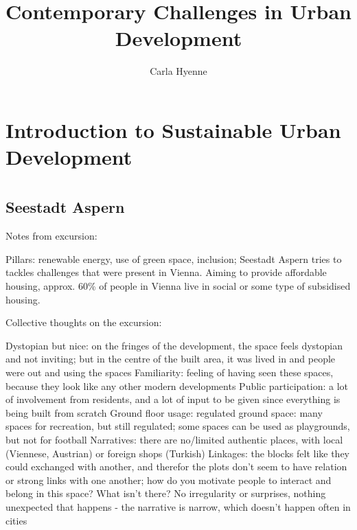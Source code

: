 \documentclass{article}
\title{Contemporary Challenges in Urban Development}
\author{Carla Hyenne}
\begin{document}
\maketitle

\tableofcontents

\pagebreak

\section{Introduction to Sustainable Urban Development}

\section{}

\subsection{Seestadt Aspern}

Notes from excursion:

\begin{outline}
	\1 Pillars: renewable energy, use of green space, inclusion;
	\1 Seestadt Aspern tries to tackles challenges that were present in Vienna. Aiming to provide affordable housing, approx. 60\% of people in Vienna live in social or some type of subsidised housing.

\end{outline}

Collective thoughts on the excursion:

\begin{outline}
	\1 Dystopian but nice: on the fringes of the development, the space feels dystopian and not inviting; but in the centre of the built area, it was lived in and people were out and using the spaces
	\1 Familiarity: feeling of having seen these spaces, because they look like any other modern developments
	\1 Public participation: a lot of involvement from residents, and a lot of input to be given since everything is being built from scratch
	\1 Ground floor usage: regulated ground space: many spaces for recreation, but still regulated; some spaces can be used as playgrounds, but not for football
	\1 Narratives: there are no/limited authentic places, with local (Viennese, Austrian) or foreign shops (Turkish)
	\1 Linkages: the blocks felt like they could exchanged with another, and therefor the plots don't seem to have relation or strong links with one another; how do you motivate people to interact and belong in this space?
	\1 What isn't there? No irregularity or surprises, nothing unexpected that happens - the narrative is narrow, which doesn't happen often in cities
\end{outline}
\end{document}

